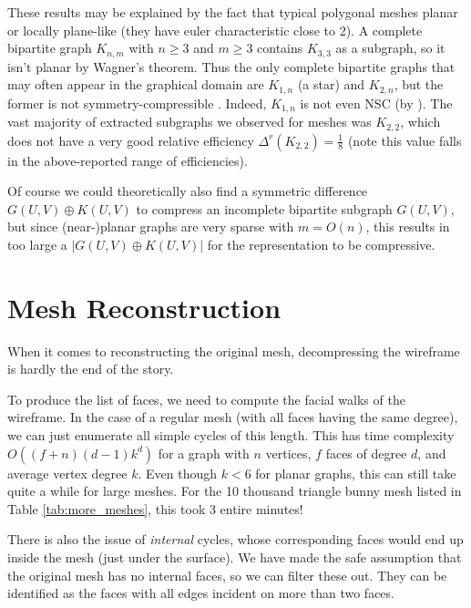 \documentclass{egpubl}
\begin{document}
These results may be explained by the fact that typical polygonal meshes planar or locally plane-like (they have euler characteristic close to 2). A complete bipartite graph $K_{n,m}$ with $n \geq 3$ and $m \geq 3$ contains $K_{3,3}$ as a subgraph, so it isn't planar by Wagner's theorem. Thus the only complete bipartite graphs that may often appear in the graphical domain are $K_{1,n}$ (a star) and $K_{2,n}$, but the former%
is not symmetry-compressible \cite[Theorem 2]{cibej2021automorphisms}. Indeed, $K_{1,n}$ is not even NSC (by \cite[Theorem 6]{cibej2021automorphisms}).
The vast majority of extracted subgraphs we observed for meshes was $K_{2,2}$, which does not have a very good relative efficiency $\Delta^r(K_{2,2}) = \frac{1}{8}$ (note this value falls in the above-reported range of efficiencies).

Of course we could theoretically also find a symmetric difference $G(U,V) \oplus K(U,V)$ to compress an incomplete bipartite subgraph $G(U,V)$, but since (near-)planar graphs are very sparse with $m = O(n)$, this results in too large a $|G(U,V) \oplus K(U,V)|$ for the representation to be compressive. %


\section{Mesh Reconstruction} \label{sec:reconstruction}

When it comes to reconstructing the original mesh,
decompressing the wireframe is hardly the end of the story.

To produce the list of faces, we need to compute the facial walks of the wireframe.
In the case of a regular mesh (with all faces having the same degree), we can just enumerate all simple cycles of this length. This has time complexity $O((f + n)(d - 1)k^d)$ for a graph with $n$ vertices, $f$ faces of degree $d$, and average vertex degree $k$. Even though $k < 6$ for planar graphs, this can still take quite a while for large meshes.
For the 10 thousand triangle bunny mesh listed in Table \ref{tab:more_meshes}, this took 3 entire minutes!

There is also the issue of \textit{internal} cycles, whose corresponding faces would end up inside the mesh (just under the surface). %
We have made the safe assumption that the original mesh has no internal faces, so we can filter these out. They can be identified as the faces with all edges incident on more than two faces.
\end{document}
